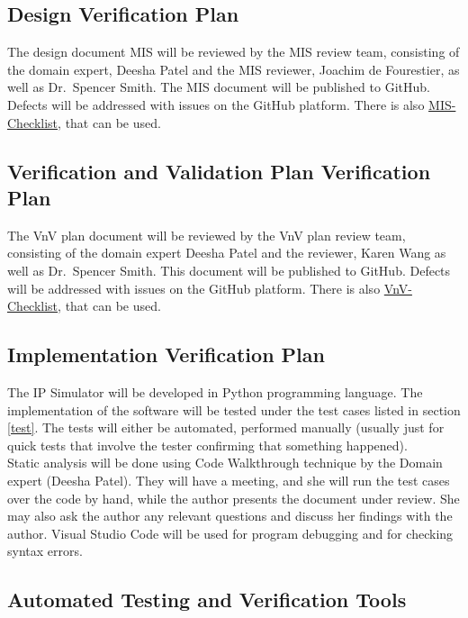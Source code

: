 \documentclass[12pt, titlepage]{article}
\begin{document}
\subsection{Design Verification Plan}

The design document MIS will be reviewed by the MIS review team, consisting of the domain expert, Deesha Patel and the MIS reviewer, Joachim de Fourestier, as well as Dr.\ Spencer Smith.
The MIS document will be published to GitHub. Defects will be addressed with issues on the GitHub platform. There is also \href{https://github.com/smiths/capTemplate/blob/main/docs/Checklists/MIS-Checklist.pdf}{MIS-Checklist}, that can be used.

\subsection{Verification and Validation Plan Verification Plan}
The VnV plan document will be reviewed by the VnV plan review team, consisting of the domain expert Deesha Patel and the reviewer, Karen Wang as well as Dr.\ Spencer Smith.
This document will be published to GitHub. Defects will be addressed with issues on the GitHub platform.
There is also \href{https://github.com/smiths/capTemplate/blob/main/docs/Checklists/VnV-Checklist.pdf}{VnV-Checklist}, that can be used.

\subsection{Implementation Verification Plan}

The IP Simulator will be developed in Python programming language. The implementation of the software will be tested under the test cases listed in section \ref{test}.
The tests will either be automated, performed manually (usually just for quick tests that involve the tester confirming that something happened). \\
Static analysis will be done using Code Walkthrough technique by the Domain expert (Deesha Patel). They will have a meeting, and she will run the test cases over the code by hand, while the author presents the document under review. She may also ask the author any relevant questions and discuss her findings with the author. Visual Studio Code will be used for program debugging and for checking syntax errors. \\
 
\subsection{Automated Testing and Verification Tools}
\end{document}
